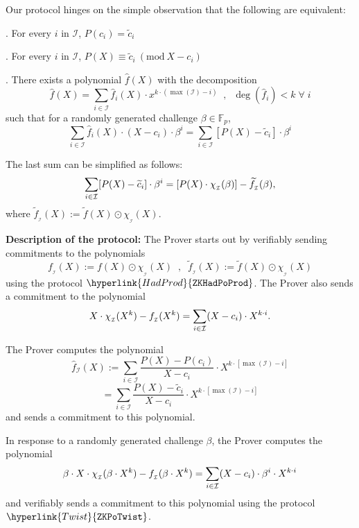 \documentclass[11pt, lettersize, notitlepage, leqno, footskip=0.6cm]{article}
\newcommand{\bFp}{\mathbb{F}_p}
\newcommand{\wti}{\widetilde}
\newcommand{\mc}{\mathcal}
\newcommand{\be}{\beta}
\newcommand{\what}{\widehat}
\newcommand{\vs}{\vspace{-0.15cm}}
\newcommand{\noin}{\noindent}
\newcommand{\Mod}[1]{\ (\mathrm{mod}\ #1)}
\numberwithin{equation}{section}
\begin{document}
Our protocol hinges on the simple observation that the following are equivalent: \vspace{2mm}

\noin 1. For every $i$ in $\mc{I}$, $ P(c_i) = \wti{c}_i $ \vspace{1mm}

\noin 2. For every $i$ in $\mc{I}$, $P(X)\equiv \wti{c}_i\Mod{X- c_i}$ \vspace{1mm}

\noin 3. There exists a polynomial $\what{f}(X)$ with the decomposition \vs $$\what{f}(X) = \sum\limits_{i\in \mc{I}}  \what{f}_i (X) \cdot x^{k\cdot (\max(\mc{I})-i)}  \;\;,\;\;\deg(\what{f}_i) < k\;\forall\;i  $$ such that for a randomly generated challenge $\be\in \bFp$, \vs $$ \sum\limits_{i\in \mc{I}} \what{f}_i (X)\cdot (X-c_i)\cdot \be^i = \sum\limits_{i\in\mc{I}} [P(X)-\wti{c}_i]\cdot \be^i    $$


\noin The last sum can be simplified as follows: \vs $$ \sum\limits_{i\in\mc{I}} [P(X)-\wti{c}_i]\cdot \be^i = [P(X)\cdot \chi_{_{\mc{I}}}(\be)] - \wti{f}_{_{\mc{I}}}(\be), \vs  $$ where $\wti{f}_{_{\mc{I}}}(X):= \wti{f}(X)\odot \chi_{_{\mc{I}}}(X).$





\bigskip

\noin \textbf{Description of the protocol:} The Prover starts out by verifiably sending commitments to the polynomials \vs $$f_{_{\mc{I}}}(X):= f(X)\odot \chi_{_{\mc{I}}}(X)\;\;,\;\; \wti{f}_{_{\mc{I}}}(X):= \wti{f}(X)\odot \chi_{_{\mc{I}}}(X)  $$ using the protocol $\hyperlink{HadProd}{\tt{ZKHadPoProd}}$. The Prover also sends a commitment to the polynomial \vs $$   X\cdot \chi_{_{\mc{I}}}(X^k) - f_{_{\mc{I}}}(X^k) = \sum\limits_{i\in \mc{I}} (X-c_i)\cdot X^{k\cdot i} . \vs $$

\noin The Prover computes the polynomial \vs $$\what{f}_{\mc{I}}(X):= \sum\limits_{i\in \mc{I}} \frac{P(X)-P(c_i)}{X-c_i}\cdot X^{k\cdot [\max(\mc{I})-i]} $$ \vspace{-3mm}  $$ = \sum\limits_{i\in \mc{I}} \frac{P(X)-\wti{c}_i}{X-c_i}\cdot X^{k\cdot [\max(\mc{I})-i]}  $$ and sends a commitment to this polynomial. 

In response to a randomly generated challenge $\be$, the Prover computes the polynomial \vs $$  \be\cdot X\cdot \chi_{_{\mc{I}}}(\be\cdot X^k) - f_{_{\mc{I}}}(\be\cdot X^k) =   \sum\limits_{i\in \mc{I}} (X-c_i)\cdot \be^i  \cdot  X^{k\cdot i} \vs $$ and verifiably sends a commitment to this polynomial using the protocol $\hyperlink{Twist}{\tt{ZKPoTwist}}$. 
\end{document}
